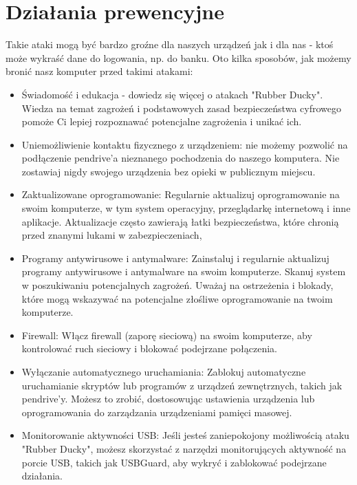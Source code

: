 \documentclass{article}
\begin{document}
\begin{itemize}
    
\end{itemize} 

\section{Działania prewencyjne}

Takie ataki mogą być bardzo groźne dla naszych urządzeń jak i dla nas - ktoś może wykraść dane do logowania, np. do banku.
Oto kilka sposobów, jak możemy bronić nasz komputer przed takimi atakami:
\begin{itemize}
    \item Świadomość i edukacja - dowiedz się więcej o atakach "Rubber Ducky". Wiedza na temat zagrożeń i podstawowych zasad bezpieczeństwa cyfrowego pomoże Ci lepiej rozpoznawać potencjalne zagrożenia i unikać ich.
    \item Uniemożliwienie kontaktu fizycznego z urządzeniem: nie możemy pozwolić na podłączenie pendrive'a nieznanego pochodzenia do naszego komputera. Nie zostawiaj nigdy swojego urządzenia bez opieki w publicznym miejscu.
    \item Zaktualizowane oprogramowanie: Regularnie aktualizuj oprogramowanie na swoim komputerze, w tym system operacyjny, przeglądarkę internetową i inne aplikacje. Aktualizacje często zawierają łatki bezpieczeństwa, które chronią przed znanymi lukami w zabezpieczeniach,
    \item Programy antywirusowe i antymalware: Zainstaluj i regularnie aktualizuj programy antywirusowe i antymalware na swoim komputerze. Skanuj system w poszukiwaniu potencjalnych zagrożeń. Uważaj na ostrzeżenia i blokady, które mogą wskazywać na potencjalne złośliwe oprogramowanie na twoim komputerze.
    \item Firewall: Włącz firewall (zaporę sieciową) na swoim komputerze, aby kontrolować ruch sieciowy i blokować podejrzane połączenia.
    \item Wyłączanie automatycznego uruchamiania: Zablokuj automatyczne uruchamianie skryptów lub programów z urządzeń zewnętrznych, takich jak pendrive'y. Możesz to zrobić, dostosowując ustawienia urządzenia lub oprogramowania do zarządzania urządzeniami pamięci masowej.
    \item Monitorowanie aktywności USB: Jeśli jesteś zaniepokojony możliwością ataku "Rubber Ducky", możesz skorzystać z narzędzi monitorujących aktywność na porcie USB, takich jak USBGuard, aby wykryć i zablokować podejrzane działania.
\end{itemize}
\end{document}
